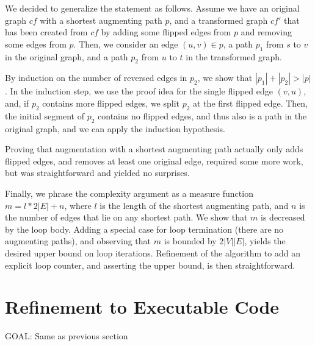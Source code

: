 \documentclass{llncs}
\begin{document}
  We decided to generalize the statement as follows. Assume we have an original graph $cf$ with a shortest augmenting path $p$, and a transformed graph $cf'$ that has been created from
  $cf$ by adding some flipped edges from $p$ and removing some edges from $p$.
  Then, we consider an edge $(u,v) \in p$, a path $p_1$ from $s$ to $v$ in the original graph, and a path $p_2$ from $u$ to $t$ in the transformed graph.
  
  By induction on the number of reversed edges in $p_2$, we 
  show that $|p_1|+|p_2| > |p|$. In the induction step, we use the proof idea for the single flipped edge $(v,u)$, and,
  if $p_2$ contains more flipped edges, we split $p_2$ at the first flipped edge. Then, the initial segment of $p_2$ contains no flipped edges,
  and thus also is a path in the original graph, and we can apply the induction hypothesis.
  
  Proving that augmentation with a shortest augmenting path actually only adds flipped edges, and removes at least one original edge, required some more work,
  but was straightforward and yielded no surprises.
  
  Finally, we phrase the complexity argument as a measure function $m = l*2|E| + n$, where $l$ is the length of the shortest augmenting path,
  and $n$ is the number of edges that lie on any shortest path. We show that $m$ is decreased by the loop body.
  Adding a special case for loop termination (there are no augmenting paths), and observing that $m$ is bounded by $2|V||E|$, yields 
  the desired upper bound on loop iterations. Refinement of the algorithm to add an explicit loop counter, and asserting the upper bound, is then straightforward.
  



    
\section{Refinement to Executable Code}
  GOAL: Same as previous section
\end{document}
